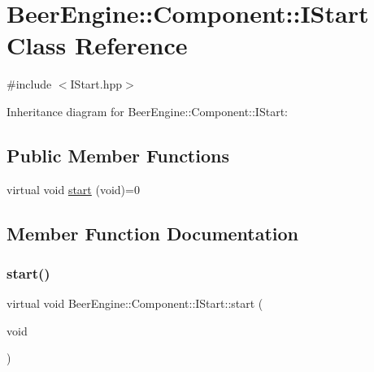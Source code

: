 \hypertarget{class_beer_engine_1_1_component_1_1_i_start}{}\section{Beer\+Engine\+:\+:Component\+:\+:I\+Start Class Reference}
\label{class_beer_engine_1_1_component_1_1_i_start}


{\ttfamily \#include $<$I\+Start.\+hpp$>$}



Inheritance diagram for Beer\+Engine\+:\+:Component\+:\+:I\+Start\+:
\subsection*{Public Member Functions}
\begin{DoxyCompactItemize}
\item 
virtual void \mbox{\hyperlink{class_beer_engine_1_1_component_1_1_i_start_aa3e25e86e20c46cdaefc6f6d7f21e495}{start}} (void)=0
\end{DoxyCompactItemize}


\subsection{Member Function Documentation}
\mbox{\label{class_beer_engine_1_1_component_1_1_i_start_aa3e25e86e20c46cdaefc6f6d7f21e495}} 
\subsubsection{\texorpdfstring{start()}{start()}}
{\footnotesize\ttfamily virtual void Beer\+Engine\+::\+Component\+::\+I\+Start\+::start (\begin{DoxyParamCaption}\item[{void}]{ }\end{DoxyParamCaption})\hspace{0.3cm}{\ttfamily [pure virtual]}}



